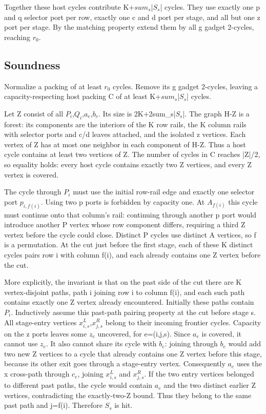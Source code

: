 \documentclass[11pt]{article}
\begin{document}
Together these host cycles contribute K+$sum_s$|$S_s$| cycles. They use exactly one p and q selector port per row, exactly one c and d port per stage, and all but one z port per stage. By the matching property extend them by all g gadget 2-cycles, reaching $r_0$.

\subsection{Soundness}

Normalize a packing of at least $r_0$ cycles. Remove its g gadget 2-cycles, leaving a capacity-respecting host packing C of at least K+$sum_s$|$S_s$| cycles.

Let Z consist of all $P_i$,$Q_i$,$a_e$,$b_e$. Its size is 2K+2sum\_s|$S_s$|. The graph H-Z is a forest: its components are the interiors of the K row rails, the K column rails with selector ports and c/d leaves attached, and the isolated z vertices. Each vertex of Z has at most one neighbor in each component of H-Z. Thus a host cycle contains at least two vertices of Z. The number of cycles in C reaches |Z|/2, so equality holds: every host cycle contains exactly two Z vertices, and every Z vertex is covered.

The cycle through $P_i$ must use the initial row-rail edge and exactly one selector port $p_{i,f(i)}$. Using two p ports is forbidden by capacity one. At $A_{f(i)}$ this cycle must continue onto that column's rail: continuing through another p port would introduce another P vertex whose row component differs, requiring a third Z vertex before the cycle could close. Distinct P cycles use distinct A vertices, so f is a permutation. At the cut just before the first stage, each of these K distinct cycles pairs row i with column f(i), and each already contains one Z vertex before the cut.

More explicitly, the invariant is that on the past side of the cut there are K vertex-disjoint paths, path i joining row i to column f(i), and each such path contains exactly one Z vertex already encountered. Initially these paths contain $P_i$. Inductively assume this past-path pairing property at the cut before stage s. All stage-entry vertices $x^L_{i,s}$,$x^R_{j,s}$ belong to their incoming frontier cycles. Capacity on the z ports leaves some $z_e$ uncovered, for e=(i,j,s). Since $a_e$ is covered, it cannot use $z_e$. It also cannot share its cycle with $b_e$: joining through $b_e$ would add two new Z vertices to a cycle that already contains one Z vertex before this stage, because its other exit goes through a stage-entry vertex. Consequently $a_e$ uses the x cross-path through $c_e$, joining $x^L_{i,s}$ and $x^R_{j,s}$. If the two entry vertices belonged to different past paths, the cycle would contain $a_e$ and the two distinct earlier Z vertices, contradicting the exactly-two-Z bound. Thus they belong to the same past path and j=f(i). Therefore $S_s$ is hit.
\end{document}
